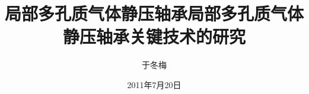 
\subject{机械制造及其自动化}
\author{于冬梅}
\date{2011年7月20日}

\ifxueweidoctor
  \title{局部多孔质气体静压轴承} %
\fi
\ifxueweimaster
  \title{局部多孔质气体静压轴承关键技术的研究}
\fi

\makecover
\clearpage
\setcounter{page}{1}